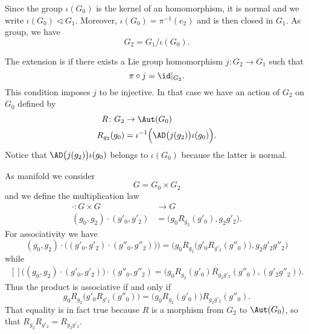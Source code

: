 Since the group $\iota(G_0)$ is the kernel of an homomorphism, it is normal and we write $\iota(G_0)\lhd G_1$. Moreover, $\iota(G_0)=\pi^{-1}(e_2)$ and is then closed in $G_1$. As group, we have
\begin{equation}
    G_2=G_1/\iota(G_0).
\end{equation}

The extension is  if there exists a Lie group homomorphism  $j\colon G_2\to G_1$ such that
\begin{equation}
    \pi\circ j=\id|_{G_2}.
\end{equation}
This condition imposes $j$ to be injective. In that case we have an action of $G_2$ on $G_0$ defined by
\begin{equation}
    \begin{aligned}
        R\colon G_2&\to \Aut(G_0) \\
        R_{g_2}(g_0)&=\iota^{-1}\Big( \AD\big( j(g_2) \big)\iota(g_0) \Big). 
    \end{aligned}
\end{equation}
Notice that $\AD\big(j(g_2)\big)\iota(g_0)$ belongs to $\iota(G_0)$ because the latter is normal.

As manifold we consider 
\begin{equation}
    G=G_0\times G_2
\end{equation}
and we define the multiplication law
\begin{equation}
    \begin{aligned}
        \cdot\colon G\times G&\to G \\
        (g_0,g_2)\cdot(g'_0,g'_2)&=\big( g_0 R_{g_2}(g'_0),g_2g'_2 \big). 
    \end{aligned}
\end{equation}
For associativity we have
\begin{equation}
    (g_0,g_2)\cdot\big( (g'_0,g'_2)\cdot (g''_0,g''_2)) \big)=\Big(  g_0R_{g_2}\big( g'_0R_{g'_2}(g''_0) \big),g_2g'_2g''_2  \Big)
\end{equation}
while
\begin{equation}
    \begin{aligned}[]
        \big( (g_0,g_2)\cdot(g'_0,g'_2) \big)\cdot(g''_0,g''_2)=\big( g_0R_{g_2}(g'_0)R_{g_2g'_2}(g''_0),(g'_2g''_2) \big).
    \end{aligned}
\end{equation}
Thus the product is associative if and only if 
\begin{equation}
    g_0R_{g_2}\big( g'_0R_{g'_2}(g''_0) \big)=\big( g_0R_{g_2}(g'_0) \big)R_{g_2g'_2}(g''_0).
\end{equation}
That equality is in fact true because $R$ is a morphism from $G_2$ to $\Aut(G_0)$, so that $R_{g_2}R_{g'_2}=R_{g_2g'_2}$. 

